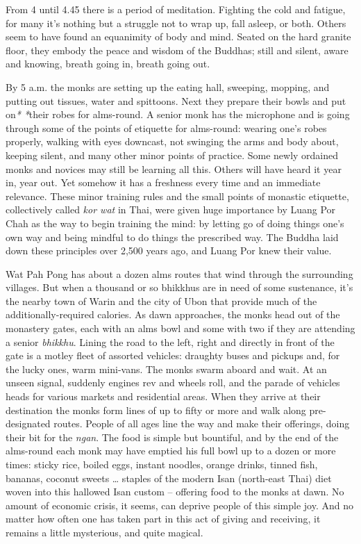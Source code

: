 From 4 until 4.45 there is a period of meditation. Fighting the cold and
fatigue, for many it's nothing but a struggle not to wrap up, fall
asleep, or both. Others seem to have found an equanimity of body and
mind. Seated on the hard granite floor, they embody the peace and wisdom
of the Buddhas; still and silent, aware and knowing, breath going in, 
breath going out. 

By 5 a.m. the monks are setting up the eating hall, sweeping, mopping, 
and putting out tissues, water and spittoons. Next they prepare their
bowls and put on\emph{*} \emph{*}their robes for alms-round. A senior
monk has the microphone and is going through some of the points of
etiquette for alms-round: wearing one's robes properly, walking with
eyes downcast, not swinging the arms and body about, keeping silent, and
many other minor points of practice. Some newly ordained monks and
novices may still be learning all this. Others will have heard it year
in, year out. Yet somehow it has a freshness every time and an immediate
relevance. These minor training rules and the small points of monastic
etiquette, collectively called \emph{kor wat} in Thai, were given huge
importance by Luang Por Chah as the way to begin training the mind: by
letting go of doing things one's own way and being mindful to do things
the prescribed way. The Buddha laid down these principles over 2,500
years ago, and Luang Por knew their value. 

Wat Pah Pong has about a dozen alms routes that wind through the
surrounding villages. But when a thousand or so bhikkhus are in need of
some sustenance, it's the nearby town of Warin and the city of Ubon that
provide much of the additionally-required calories. As dawn approaches, 
the monks head out of the monastery gates, each with an alms bowl and
some with two if they are attending a senior \emph{bhikkhu}. Lining the
road to the left, right and directly in front of the gate is a motley
fleet of assorted vehicles: draughty buses and pickups and, for the
lucky ones, warm mini-vans. The monks swarm aboard and wait. At an
unseen signal, suddenly engines rev and wheels roll, and the parade of
vehicles heads for various markets and residential areas. When they
arrive at their destination the monks form lines of up to fifty or more
and walk along pre-designated routes. People of all ages line the way
and make their offerings, doing their bit for the \emph{ngan}. The food
is simple but bountiful, and by the end of the alms-round each monk may
have emptied his full bowl up to a dozen or more times: sticky rice, 
boiled eggs, instant noodles, orange drinks, tinned fish, bananas, 
coconut sweets \ldots{} staples of the modern Isan (north-east Thai)
diet woven into this hallowed Isan custom -- offering food to the monks
at dawn. No amount of economic crisis, it seems, can deprive people of
this simple joy. And no matter how often one has taken part in this act
of giving and receiving, it remains a little mysterious, and quite
magical. 

